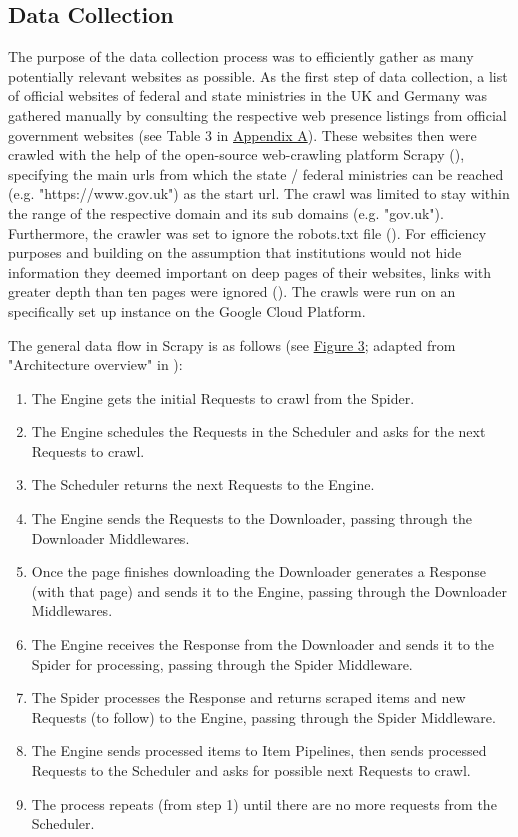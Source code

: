 \subsection{Data Collection}
The purpose of the data collection process was to efficiently gather as many potentially relevant websites as possible. As the first step of data collection, a list of official websites of federal and state ministries in the UK and Germany was gathered manually by consulting the respective web presence listings from official government websites (see Table 3 in \hyperref[Appendix A]{Appendix A}). These websites then were crawled with the help of the open-source web-crawling platform Scrapy (\cite{Kouzis-Loukas2016}), specifying the main urls from which the state / federal ministries can be reached (e.g. "https://www.gov.uk") as the start url. The crawl was limited to stay within the range of the respective domain and its sub domains (e.g. "gov.uk"). Furthermore, the crawler was set to ignore the robots.txt file (\cite{Sun2007}). For efficiency purposes and building on the assumption that institutions would not hide information they deemed important on deep pages of their websites, links with greater depth than ten pages were ignored (\cite{Scrapy2018, Wang2019}). The crawls were run on an specifically set up instance on the Google Cloud Platform.\par
The general data flow in Scrapy is as follows (see \hyperref[fig:Scrapy Architecture]{Figure 3}; adapted from "Architecture overview" in \cite{Scrapy2018}):
\begin{enumerate}
    \setlength\itemsep{0.001em}
        \item The Engine gets the initial Requests to crawl from the Spider.
        \item The Engine schedules the Requests in the Scheduler and asks for the next Requests to crawl.
        \item The Scheduler returns the next Requests to the Engine.
        \item The Engine sends the Requests to the Downloader, passing through the Downloader Middlewares.
        \item Once the page finishes downloading the Downloader generates a Response (with that page) and sends it to the Engine, passing through the Downloader Middlewares.
        \item The Engine receives the Response from the Downloader and sends it to the Spider for processing, passing through the Spider Middleware.
        \item The Spider processes the Response and returns scraped items and new Requests (to follow) to the Engine, passing through the Spider Middleware.
        \item The Engine sends processed items to Item Pipelines, then sends processed Requests to the Scheduler and asks for possible next Requests to crawl.
        \item The process repeats (from step 1) until there are no more requests from the Scheduler.
\end{enumerate}\par 
